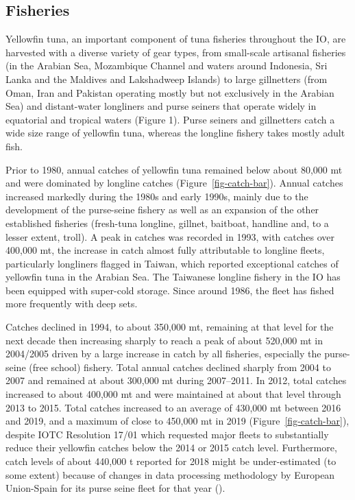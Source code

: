 \documentclass[
]{scrartcl}
\begin{document}
\subsection{Fisheries}\label{fisheries}

Yellowfin tuna, an important component of tuna fisheries throughout the
IO, are harvested with a diverse variety of gear types, from small-scale
artisanal fisheries (in the Arabian Sea, Mozambique Channel and waters
around Indonesia, Sri Lanka and the Maldives and Lakshadweep Islands) to
large gillnetters (from Oman, Iran and Pakistan operating mostly but not
exclusively in the Arabian Sea) and distant-water longliners and purse
seiners that operate widely in equatorial and tropical waters (Figure
1). Purse seiners and gillnetters catch a wide size range of yellowfin
tuna, whereas the longline fishery takes mostly adult fish.

Prior to 1980, annual catches of yellowfin tuna remained below about
80,000 mt and were dominated by longline catches
(Figure~\ref{fig-catch-bar}). Annual catches increased markedly during
the 1980s and early 1990s, mainly due to the development of the
purse-seine fishery as well as an expansion of the other established
fisheries (fresh-tuna longline, gillnet, baitboat, handline and, to a
lesser extent, troll). A peak in catches was recorded in 1993, with
catches over 400,000 mt, the increase in catch almost fully attributable
to longline fleets, particularly longliners flagged in Taiwan, which
reported exceptional catches of yellowfin tuna in the Arabian Sea. The
Taiwanese longline fishery in the IO has been equipped with super-cold
storage. Since around 1986, the fleet has fished more frequently with
deep sets.

Catches declined in 1994, to about 350,000 mt, remaining at that level
for the next decade then increasing sharply to reach a peak of about
520,000 mt in 2004/2005 driven by a large increase in catch by all
fisheries, especially the purse-seine (free school) fishery. Total
annual catches declined sharply from 2004 to 2007 and remained at about
300,000 mt during 2007--2011. In 2012, total catches increased to about
400,000 mt and were maintained at about that level through 2013 to 2015.
Total catches increased to an average of 430,000 mt between 2016 and
2019, and a maximum of close to 450,000 mt in 2019
(Figure~\ref{fig-catch-bar}), despite IOTC Resolution 17/01 which
requested major fleets to substantially reduce their yellowfin catches
below the 2014 or 2015 catch level. Furthermore, catch levels of about
440,000 t reported for 2018 might be under-estimated (to some extent)
because of changes in data processing methodology by European
Union-Spain for its purse seine fleet for that year
().
\end{document}
